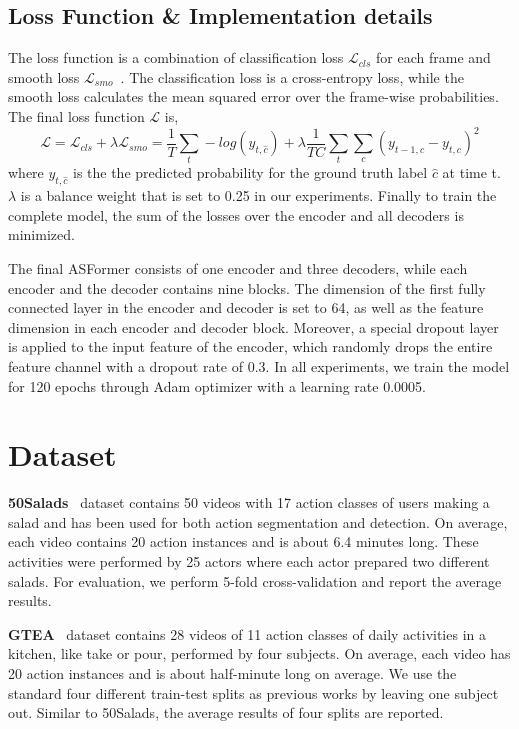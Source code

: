 \documentclass{bmvc2k}
\begin{document}
\subsection{Loss Function \& Implementation details}
\label{details}
The loss function is a combination of classification loss $\mathcal{L}_{cls}$ for each frame and smooth loss $\mathcal{L}_{smo}$~\cite{MSTCN}. The classification loss is a cross-entropy loss, while the smooth loss calculates the mean squared error over the frame-wise probabilities. The final loss function $\mathcal{L}$ is,
$$\mathcal{L} = \mathcal{L}_{cls} + \lambda \mathcal{L}_{smo} = \frac{1}{T} \sum_{t}-log(y_{t,\hat{c}}) + \lambda \frac{1}{TC}\sum_{t}\sum_{c}(y_{t-1, c}-y_{t,c})^2$$ 
where $y_{t,\hat{c}}$ is the the predicted probability for the ground truth label $\hat{c}$ at time t. $\lambda$ is a balance weight that is set to 0.25 in our experiments. Finally to train the complete model, the sum of the losses over the encoder and all decoders is minimized.

The final ASFormer consists of one encoder and three decoders, while each encoder and the decoder contains nine blocks. The dimension of the first fully connected layer in the encoder and decoder is set to 64, as well as the feature dimension in each encoder and decoder block. Moreover, a special dropout layer is applied to the input feature of the encoder, which randomly drops the entire feature channel with a dropout rate of 0.3.  In all experiments, we train the model for 120 epochs through Adam optimizer with a learning rate 0.0005.


\section{Dataset}

\textbf{50Salads}~\cite{50salads} dataset contains 50 videos with 17 action classes of users making a salad and has been used for both action segmentation and detection. On average, each video contains 20 action instances and is about 6.4 minutes long. These activities were performed by 25 actors where each actor prepared two different salads. For evaluation, we perform 5-fold cross-validation and report the average results.

\noindent
\textbf{GTEA}~\cite{gtea} dataset contains 28 videos of 11 action classes of daily activities in a kitchen, like take or pour, performed by four subjects. On average, each video has 20 action instances and is about half-minute long on average. We use the standard four different train-test splits as previous works by leaving one subject out. Similar to 50Salads, the average results of four splits are reported.
\end{document}
